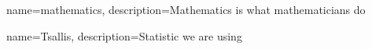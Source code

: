 
{
    name=mathematics,
    description={Mathematics is what mathematicians do}
}

{
    name=Tsallis,
    description={Statistic we are using}
}
